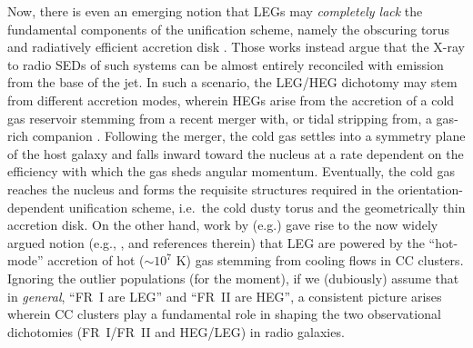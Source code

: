 Now, there is even an emerging notion that LEGs may {\it completely lack} the
fundamental components of the unification scheme, namely the obscuring torus
and radiatively efficient accretion disk
\citep{zirbel95,baum95,chiaberge02,whysong04,hardcastle06}.  Those works instead argue that the
X-ray to radio SEDs of such systems can be almost entirely reconciled with
emission from the base of the jet.   In such a scenario, the LEG/HEG dichotomy
may stem from different accretion modes, wherein HEGs arise from the accretion
of a cold gas reservoir stemming from a recent merger with, or tidal stripping
from, a gas-rich companion \citep{baldi08}.  Following the merger, the cold gas
settles into a symmetry plane of the host galaxy and falls inward toward the
nucleus at a rate dependent on the efficiency with which the gas sheds angular
momentum.  Eventually, the cold gas reaches the nucleus and forms the requisite
structures required in the orientation-dependent unification scheme, i.e.~the
cold dusty torus and the geometrically thin accretion disk.  On the other hand,
work by (e.g.) \citet{baum92,baum95} gave rise to the now widely argued notion
(e.g., \citealt{hardcastle07}, and references therein) that LEG are powered by
the ``hot-mode'' accretion of hot ($\sim 10^7$ K) gas stemming from cooling
flows in CC clusters.
Ignoring the outlier populations (for the moment), if we (dubiously) assume that in {\it general}, ``FR~I are LEG'' and ``FR~II are HEG'', 
a consistent picture arises wherein CC clusters play a fundamental role in shaping the two 
observational dichotomies (FR~I/FR~II and HEG/LEG) in radio galaxies. 

 

